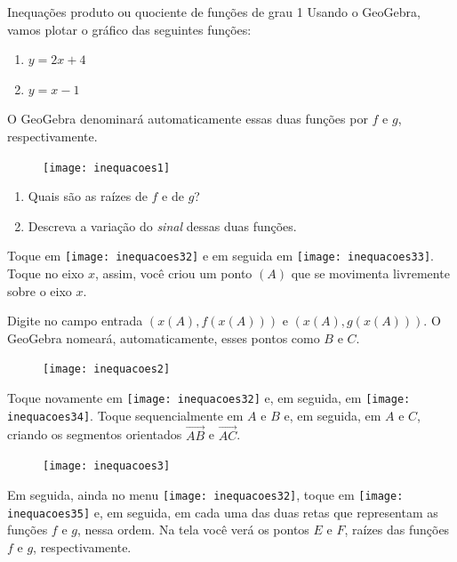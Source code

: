 \begin{task}{Inequações produto ou quociente de funções de grau 1}
Usando o GeoGebra, vamos plotar o gráfico das seguintes funções:
\begin{enumerate}[label=\titem{\roman*)}]
\item $y=2x+4$
\item $y=x-1$
\end{enumerate}

O GeoGebra denominará automaticamente essas duas funções por $f$ e $g$, respectivamente.

\begin{figure}[H]
\centering

\texttt{[image: inequacoes1]}
\end{figure}


\begin{enumerate}
\item Quais são as raízes de $f$ e de $g$?
\item Descreva a variação do \textit{sinal} dessas duas funções. 
\end{enumerate}

Toque em \texttt{[image: inequacoes32]} e em seguida em \texttt{[image: inequacoes33]}. Toque no eixo $x$, assim, você criou um ponto $(A)$ que se movimenta livremente sobre o eixo $x$.

Digite no campo entrada $(x(A),f(x(A)))$ e $(x(A),g(x(A)))$. O GeoGebra nomeará, automaticamente, esses pontos como $B$ e $C$.

\begin{figure}[H]
\centering

\texttt{[image: inequacoes2]}
\end{figure}

Toque novamente em \texttt{[image: inequacoes32]} e, em seguida, em \texttt{[image: inequacoes34]}. Toque sequencialmente em $A$ e $B$ e, em seguida, em $A$ e $C$, criando os segmentos orientados $\overrightarrow{AB}$ e $\overrightarrow{AC}$. 

\begin{figure}[H]
\centering

\texttt{[image: inequacoes3]}
\end{figure}

Em seguida, ainda no menu  \texttt{[image: inequacoes32]}, toque em \texttt{[image: inequacoes35]} e, em seguida, em cada uma das duas retas que representam as funções $f$ e $g$, nessa ordem. Na tela você verá os pontos $E$ e $F$, raízes das funções $f$ e $g$, respectivamente.


\end{task}
